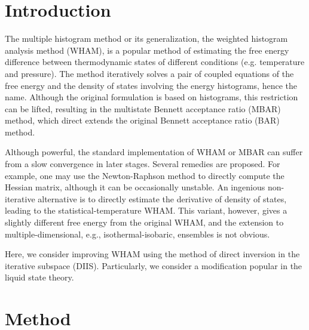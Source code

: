 \documentclass[preprint]{revtex4-1}
\begin{document}
\newcommand{\vct}[1]{\mathbf{#1}}



\section{Introduction}



The multiple histogram method\cite{
  ferrenberg1988, *ferrenberg1989}
or its generalization,
the weighted histogram analysis method (WHAM)\cite{
  kumar1992, souaille2001, kastner2005,
  chodera2007, bereau2009,
  kim2011},
is a popular method of estimating
the free energy difference
between thermodynamic states
of different conditions (e.g. temperature and pressure).
%
The method iteratively solves a pair of coupled equations of
the free energy and the density of states
involving the energy histograms, hence the name.
%
Although the original formulation is
based on histograms,
this restriction can be lifted,
resulting in the
multistate Bennett acceptance ratio (MBAR) method\cite{
shirts2008},
which direct extends the original
Bennett acceptance ratio (BAR) method\cite{
bennett1976}.



Although powerful,
the standard implementation of WHAM or MBAR can suffer from
a slow convergence in later stages.
%
Several remedies are proposed\cite{
shirts2008, bereau2009, kim2011}.
%
For example, one may use the Newton-Raphson method
to directly compute the Hessian matrix\cite{
shirts2008}, although it can be occasionally unstable.
%
An ingenious non-iterative alternative
is to directly estimate the derivative of density of states,
leading to the statistical-temperature WHAM\cite{
kim2011}.
%
This variant, however, gives
a slightly different free energy from the original WHAM,
and the extension to multiple-dimensional,
e.g., isothermal-isobaric, ensembles
is not obvious.



Here, we consider improving WHAM using
the method of direct inversion in the iterative subspace (DIIS)\cite{
pulay1980, *pulay1982, *hamilton1986}.
%
Particularly, we consider a modification
popular in the liquid state theory\cite
{kovalenko1999, howard2011}.




\section{Method}
\end{document}

